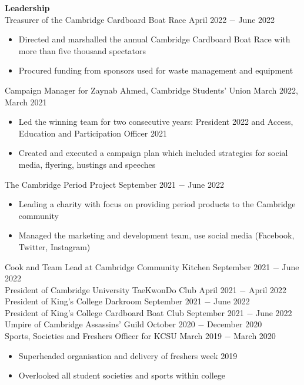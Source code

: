 \documentclass{article}
\begin{document}
\textbf{Leadership}\\
Treasurer of the Cambridge Cardboard Boat Race \hfill April 2022 $-$ June 2022
\begin{itemize}
    \item Directed and marshalled the annual Cambridge Cardboard Boat Race with more than five thousand spectators
    \item Procured funding from sponsors used for waste management and equipment
\end{itemize}
Campaign Manager for Zaynab Ahmed, Cambridge Students' Union \hfill March 2022, March 2021
\begin{itemize}
    \item Led the winning team for two consecutive years: President 2022 and Access, Education and Participation Officer 2021
    \item Created and executed a campaign plan which included strategies for social media, flyering, hustings and speeches
\end{itemize}
The Cambridge Period Project \hfill  September 2021 $-$ June 2022
\begin{itemize}
    \item Leading a charity with focus on providing period products to the Cambridge community
    \item Managed the marketing and development team, use social media (Facebook, Twitter, Instagram)
\end{itemize}
Cook and Team Lead at Cambridge Community Kitchen \hfill September 2021 $-$ June 2022\\
President of Cambridge University TaeKwonDo Club \hfill April 2021 $-$ April 2022\\
President of King's College Darkroom \hfill September 2021 $-$ June 2022\\ 
President of King's College Cardboard Boat Club \hfill September 2021 $-$ June 2022\\
Umpire of Cambridge Assassins' Guild \hfill October 2020 $-$ December 2020\\
Sports, Societies and Freshers Officer for KCSU \hfill March 2019 $-$ March 2020
\begin{itemize}
    \item Superheaded organisation and delivery of freshers week 2019
    \item Overlooked all student societies and sports within college
\end{itemize} \medskip
\end{document}
